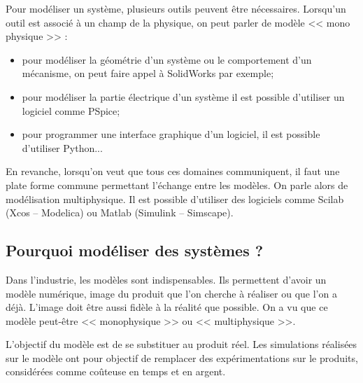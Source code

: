 Pour modéliser un système, plusieurs outils peuvent être nécessaires. Lorsqu'un outil est associé à un champ de la physique, on peut parler de modèle << mono physique >> :
\begin{itemize}
\item pour modéliser la géométrie d'un système ou le comportement d'un mécanisme, on peut faire appel à SolidWorks par exemple;
\item pour modéliser la partie électrique d'un système il est possible d'utiliser un logiciel comme PSpice;
\item pour programmer une interface graphique d'un logiciel, il est possible d'utiliser Python...
\end{itemize}

En revanche, lorsqu'on veut que tous ces domaines communiquent, il faut une plate forme commune permettant l'échange entre les modèles. On parle alors de modélisation multiphysique. Il est possible d'utiliser des logiciels comme Scilab (Xcos -- Modelica) ou Matlab (Simulink -- Simscape). 



\subsection{Pourquoi modéliser des systèmes ?}
Dans l'industrie, les modèles sont indispensables. Ils permettent d'avoir un modèle numérique, image du produit que l'on cherche à réaliser ou que l'on a déjà. L'image doit être aussi fidèle à la réalité que possible. On a vu que ce modèle peut-être << monophysique >> ou << multiphysique >>. 

L'objectif du modèle est de se substituer au produit réel. Les simulations réalisées sur le modèle ont pour objectif de remplacer des expérimentations sur le produits, considérées comme coûteuse en temps et en argent. 

